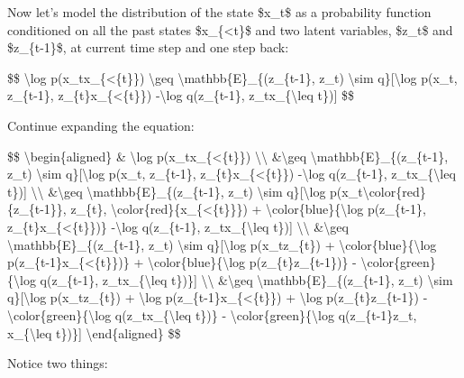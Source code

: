 Now let's model the distribution of the state \$x\_t\$ as a probability function conditioned on all the past states \$x\_\{\textless t\}\$ and two latent variables, \$z\_t\$ and \$z\_\{t-1\}\$, at current time step and one step back:

\$\$ \textbackslash log p(x\_t\textbar x\_\{\textless\{t\}\}) \textbackslash geq \textbackslash mathbb\{E\}\_\{(z\_\{t-1\}, z\_t) \textbackslash sim q\}{[}\textbackslash log p(x\_t, z\_\{t-1\}, z\_\{t\}\textbar x\_\{\textless\{t\}\}) -\textbackslash log q(z\_\{t-1\}, z\_t\textbar x\_\{\textbackslash leq t\}){]} \$\$

Continue expanding the equation:

\$\$ \textbackslash begin\{aligned\} \& \textbackslash log p(x\_t\textbar x\_\{\textless\{t\}\}) \textbackslash\textbackslash{} \&\textbackslash geq \textbackslash mathbb\{E\}\_\{(z\_\{t-1\}, z\_t) \textbackslash sim q\}{[}\textbackslash log p(x\_t, z\_\{t-1\}, z\_\{t\}\textbar x\_\{\textless\{t\}\}) -\textbackslash log q(z\_\{t-1\}, z\_t\textbar x\_\{\textbackslash leq t\}){]} \textbackslash\textbackslash{} \&\textbackslash geq \textbackslash mathbb\{E\}\_\{(z\_\{t-1\}, z\_t) \textbackslash sim q\}{[}\textbackslash log p(x\_t\textbar\textbackslash color\{red\}\{z\_\{t-1\}\}, z\_\{t\}, \textbackslash color\{red\}\{x\_\{\textless\{t\}\}\}) + \textbackslash color\{blue\}\{\textbackslash log p(z\_\{t-1\}, z\_\{t\}\textbar x\_\{\textless\{t\}\})\} -\textbackslash log q(z\_\{t-1\}, z\_t\textbar x\_\{\textbackslash leq t\}){]} \textbackslash\textbackslash{} \&\textbackslash geq \textbackslash mathbb\{E\}\_\{(z\_\{t-1\}, z\_t) \textbackslash sim q\}{[}\textbackslash log p(x\_t\textbar z\_\{t\}) + \textbackslash color\{blue\}\{\textbackslash log p(z\_\{t-1\}\textbar x\_\{\textless\{t\}\})\} + \textbackslash color\{blue\}\{\textbackslash log p(z\_\{t\}\textbar z\_\{t-1\})\} - \textbackslash color\{green\}\{\textbackslash log q(z\_\{t-1\}, z\_t\textbar x\_\{\textbackslash leq t\})\}{]} \textbackslash\textbackslash{} \&\textbackslash geq \textbackslash mathbb\{E\}\_\{(z\_\{t-1\}, z\_t) \textbackslash sim q\}{[}\textbackslash log p(x\_t\textbar z\_\{t\}) + \textbackslash log p(z\_\{t-1\}\textbar x\_\{\textless\{t\}\}) + \textbackslash log p(z\_\{t\}\textbar z\_\{t-1\}) - \textbackslash color\{green\}\{\textbackslash log q(z\_t\textbar x\_\{\textbackslash leq t\})\} - \textbackslash color\{green\}\{\textbackslash log q(z\_\{t-1\}\textbar z\_t, x\_\{\textbackslash leq t\})\}{]} \textbackslash end\{aligned\} \$\$

Notice two things:

